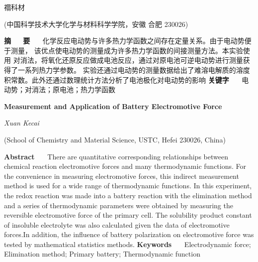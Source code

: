 \documentclass[12pt]{ctexart}
\numberwithin{equation}{section}
\begin{document}
\nocite{*}

\begin{center}
    \heiti {}

    \vspace{12pt}

    \kaishu \fontsize{13.75pt}{0}禤科材
    


    \vspace{5pt}

    \songti \fontsize{12pt}{0}(中国科学技术大学化学与材料科学学院，安徽 合肥 230026)
\end{center}

\noindent\textbf{摘~~~\!要}~~~\!
{化学反应电动势与许多热力学函数之间存在定量关系。由于电动势便于测量，
该优点使电动势的测量成为许多热力学函数的间接测量方法。本实验使用
对消法，将氧化还原反应做成电池反应，通过对原电池可逆电动势进行测量获得了一系列热力学参数。
实验还通过电动势的测量数据给出了难溶电解质的溶度积常数。此外还通过数理统计方法分析了电池极化对电动势的影响}
\newline
\textbf{关键字}~~~\!
{\kaishu 电动势；对消法；原电池；热力学函数}

\begin{center}
    {\Large\rmfamily\textbf{Measurement and Application of Battery Electromotive Force}}

    \vspace{12pt}

    {\slshape Xuan Kecai}

    \vspace{5pt}

    (School of Chemistry and Material Science, USTC, Hefei 230026, China)
\end{center}

\noindent\textbf{Abstract}~~~\!
{\linespread{0.5} There are quantitative corresponding relationships between chemical reaction electromotive forces and many thermodynamic
functions. For the convenience in measuring electromotive forces, this 
indirect measurement method is used for a wide range of thermodynamic functions.
In this experiment, the redox reaction was made into a battery reaction with the elimination method and a series of thermodynamic parameters were
obtained by measuring the reversible electromotive force of
the primary cell. The solubility product constant of insoluble
electrolyte was also calculated given the data of electromotive forces.In addition, the influence of battery polarization on electromotive force was tested by mathematical statistics methods.}
\newline
\textbf{Keywords}~~~\!
Electrodynamic force; Elimination method; Primary battery;
Thermodynamic function
\end{document}
